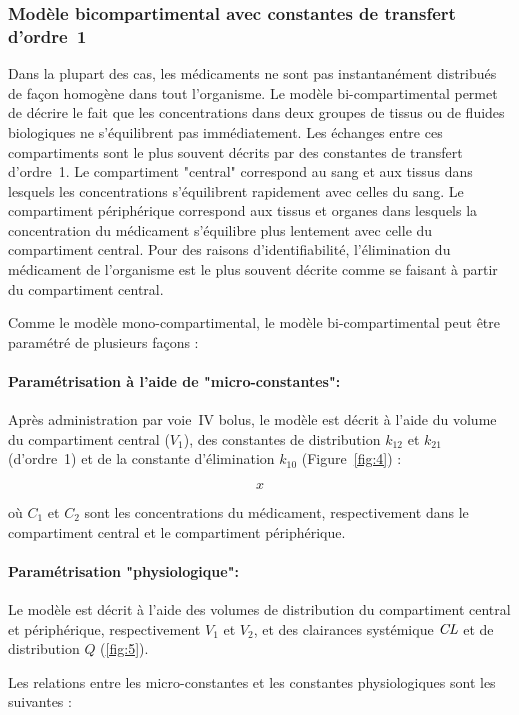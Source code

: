 \subsubsection{Modèle bicompartimental avec constantes de transfert d'ordre~1}
Dans la plupart des cas, les médicaments ne sont pas instantanément distribués de façon homogène dans tout l'organisme. Le modèle bi-compartimental permet de décrire le fait que les concentrations dans deux groupes de tissus ou de fluides biologiques ne s'équilibrent pas immédiatement. Les échanges entre ces compartiments sont le plus souvent décrits par des constantes de transfert d'ordre~1. Le compartiment "central" correspond au sang et aux tissus dans lesquels les concentrations s'équilibrent rapidement avec celles du sang. Le compartiment périphérique correspond aux tissus et organes dans lesquels la concentration du médicament s'équilibre plus lentement avec celle du compartiment central. Pour des raisons d'identifiabilité, l'élimination du médicament de l'organisme est le plus souvent décrite comme se faisant à partir du compartiment central.

Comme le modèle mono-compartimental, le modèle bi-compartimental peut être paramétré de plusieurs façons :

\paragraph*{Paramétrisation à l'aide de "micro-constantes":} Après administration par voie~IV bolus, le modèle est décrit à l'aide du volume du compartiment central ($V_1$), des constantes de distribution $k_{12}$ et $k_{21}$ (d'ordre~1) et de la constante d'élimination $k_{10}$ (Figure~\ref{fig:4}) :

\begin{equation}
x
\label{eq:24}
\end{equation}

où $C_1$ et $C_2$ sont les concentrations du médicament, respectivement dans le compartiment central et le compartiment périphérique.

\paragraph*{Paramétrisation "physiologique":} Le modèle est décrit à l'aide des volumes de distribution du compartiment central et périphérique, respectivement $V_1$ et $V_2$, et des clairances systémique $\operatorname{\textit{CL}}$ et de distribution $Q$ (\ref{fig:5}). 

Les relations entre les micro-constantes et les constantes physiologiques sont les suivantes :

